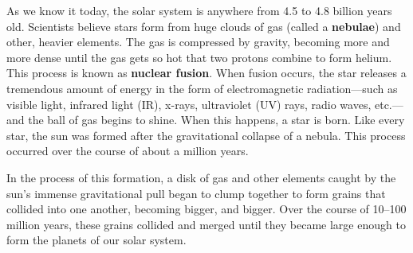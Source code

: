     As we know it today, the solar system is anywhere from 4.5 to 4.8 billion years old. Scientists believe stars form from huge clouds of gas (called a \textbf{nebulae}) and other, heavier elements. The gas is compressed by gravity, becoming more and more dense until the gas gets so hot that two protons combine to form helium. %
    This process is known as \textbf{nuclear fusion}. When fusion occurs, the star releases a tremendous amount of energy in the form of electromagnetic radiation---such as visible light, infrared light (IR), x-rays, ultraviolet (UV) rays, radio waves, etc.---and the ball of gas begins to shine. When this happens, a star is born. Like every star, the sun was formed after the gravitational collapse of a nebula. This process occurred over the course of about a million years.\cite{formation_solar}

    In the process of this formation, a disk of gas and other elements caught by the sun's immense gravitational pull began to clump together to form grains that collided into one another, becoming bigger, and bigger. Over the course of 10--100 million years, these grains collided and merged until they became large enough to form the planets of our solar system.\cite{hayashi1985formation}

